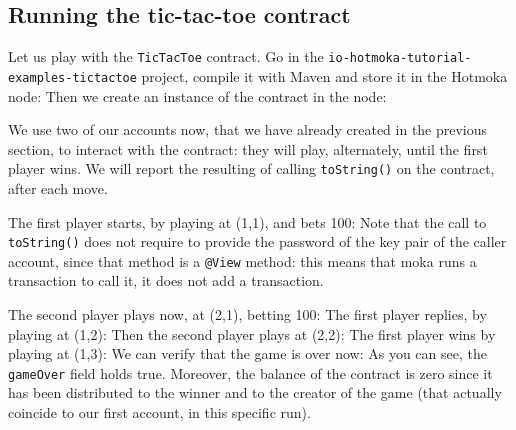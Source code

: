 \subsection{Running the tic-tac-toe contract}\label{subsec:running_tictactoe}

Let us play with the \texttt{TicTacToe} contract. Go in
the \texttt{io-hotmoka-tutorial-examples-tictactoe} project,
compile it with Maven and store it in the Hotmoka node:
%
%
Then we create an instance of the contract in the node:
%

We use two of our accounts now, that we have already created in the previous section,
to interact with the contract: they will play, alternately, until the first player wins.
We will report the resulting of calling \texttt{toString()} on the contract, after each move.

The first player starts, by playing at (1,1), and bets 100:
%
%
%
Note that the call to \texttt{toString()} does not require to provide the password of the key pair of the caller account,
since that method is a \texttt{@View} method: this means that moka runs a transaction to call it, it does not add a transaction.

The second player plays now, at (2,1), betting 100:
%
%
%
The first player replies, by playing at (1,2):
%
%
%
Then the second player plays at (2,2):
%
%
%
The first player wins by playing at (1,3):
%
%
%
We can verify that the game is over now:
%
%
As you can see, the \texttt{gameOver} field holds true. Moreover, the balance of the contract is zero since it has been distributed to
the winner and to the creator of the game (that actually coincide to our first account, in this specific run).

